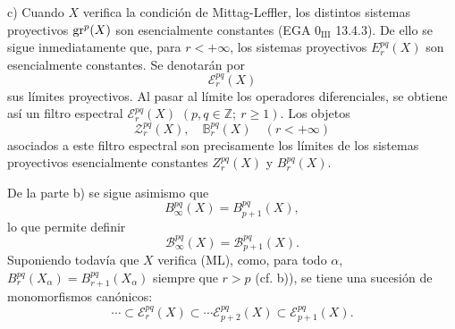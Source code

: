 c) Cuando \(X\) verifica la condición de Mittag-Leffler, los distintos sistemas proyectivos \(\operatorname{gr}^p(X)\) son esencialmente constantes (EGA \(0_{\mathrm{III}}\) 13.4.3). De ello se sigue inmediatamente que, para \(r<+\infty\), los sistemas proyectivos \(E_r^{pq}(X)\) son esencialmente constantes. Se denotarán por
\[
\mathcal E_r^{pq}(X)
\]
sus límites proyectivos. Al pasar al límite los operadores diferenciales, se obtiene así un filtro espectral \(\mathcal E_r^{pq}(X)\) \((p,q\in\mathbb Z;\ r\ge1)\). Los objetos
\[
\mathcal Z_r^{pq}(X),\quad \mathbb B_r^{pq}(X)\quad(r<+\infty)
\]
asociados a este filtro espectral son precisamente los límites de los sistemas proyectivos esencialmente constantes \(Z_r^{pq}(X)\) y \(B_r^{pq}(X)\).

De la parte b) se sigue asimismo que
\[
B_\infty^{pq}(X)=B_{p+1}^{pq}(X),
\]
lo que permite definir
\[
\mathcal B_\infty^{pq}(X)=\mathcal B_{p+1}^{pq}(X).
\]
Suponiendo todavía que \(X\) verifica (ML), como, para todo \(\alpha\),
\(B_r^{pq}(X_\alpha)=B_{r+1}^{pq}(X_\alpha)\) siempre que \(r>p\) (cf. b)),
se tiene una sucesión de monomorfismos canónicos:
\begin{equation}
\cdots\subset\mathcal E_r^{pq}(X)\subset\cdots\mathcal E_{p+2}^{pq}(X)\subset\mathcal E_{p+1}^{pq}(X).
\tag{S}
\end{equation}
